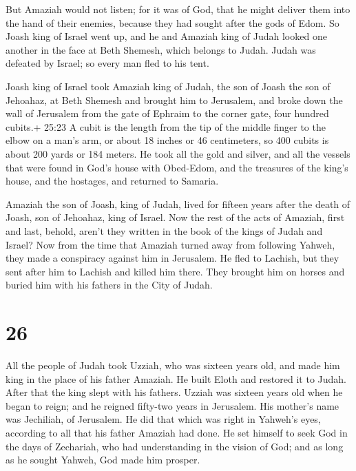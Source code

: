  But Amaziah would not listen; for it was of God, that he
might deliver them into the hand of their enemies, because they had
sought after the gods of Edom.  So Joash king of Israel
went up, and he and Amaziah king of Judah looked one another in the face
at Beth Shemesh, which belongs to Judah.  Judah was
defeated by Israel; so every man fled to his tent.

 Joash king of Israel took Amaziah king of Judah, the son
of Joash the son of Jehoahaz, at Beth Shemesh and brought him to
Jerusalem, and broke down the wall of Jerusalem from the gate of Ephraim
to the corner gate, four hundred cubits.+ 25:23 A cubit is the length
from the tip of the middle finger to the elbow on a man's arm, or about
18 inches or 46 centimeters, so 400 cubits is about 200 yards or 184
meters.  He took all the gold and silver, and all the
vessels that were found in God's house with Obed-Edom, and the treasures
of the king's house, and the hostages, and returned to Samaria.

 Amaziah the son of Joash, king of Judah, lived for fifteen
years after the death of Joash, son of Jehoahaz, king of Israel.
 Now the rest of the acts of Amaziah, first and last,
behold, aren't they written in the book of the kings of Judah and
Israel?  Now from the time that Amaziah turned away from
following Yahweh, they made a conspiracy against him in Jerusalem. He
fled to Lachish, but they sent after him to Lachish and killed him
there.  They brought him on horses and buried him with his
fathers in the City of Judah.

\hypertarget{section-25}{%
\section{26}\label{section-25}}

 All the people of Judah took Uzziah, who was sixteen years
old, and made him king in the place of his father Amaziah. 
He built Eloth and restored it to Judah. After that the king slept with
his fathers.  Uzziah was sixteen years old when he began to
reign; and he reigned fifty-two years in Jerusalem. His mother's name
was Jechiliah, of Jerusalem.  He did that which was right in
Yahweh's eyes, according to all that his father Amaziah had done.
 He set himself to seek God in the days of Zechariah, who
had understanding in the vision of God; and as long as he sought Yahweh,
God made him prosper.

